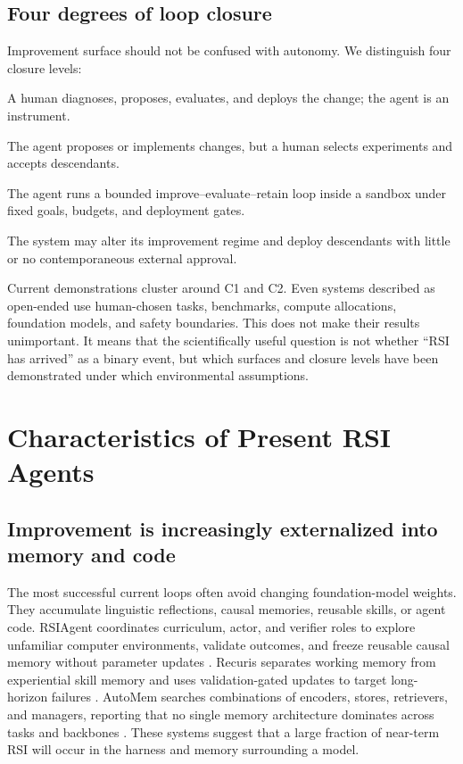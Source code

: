 \documentclass[11pt,a4paper]{article}
\begin{document}
\subsection{Four degrees of loop closure}

Improvement surface should not be confused with autonomy. We distinguish four closure levels:
\begin{description}[leftmargin=1.25cm,style=nextline]
  \item[C0] A human diagnoses, proposes, evaluates, and deploys the change; the agent is an instrument.
  \item[C1] The agent proposes or implements changes, but a human selects experiments and accepts descendants.
  \item[C2] The agent runs a bounded improve--evaluate--retain loop inside a sandbox under fixed goals, budgets, and deployment gates.
  \item[C3] The system may alter its improvement regime and deploy descendants with little or no contemporaneous external approval.
\end{description}
Current demonstrations cluster around C1 and C2. Even systems described as open-ended use human-chosen tasks, benchmarks, compute allocations, foundation models, and safety boundaries. This does not make their results unimportant. It means that the scientifically useful question is not whether ``RSI has arrived'' as a binary event, but which surfaces and closure levels have been demonstrated under which environmental assumptions.

\section{Characteristics of Present RSI Agents}

\subsection{Improvement is increasingly externalized into memory and code}

The most successful current loops often avoid changing foundation-model weights. They accumulate linguistic reflections, causal memories, reusable skills, or agent code. RSIAgent coordinates curriculum, actor, and verifier roles to explore unfamiliar computer environments, validate outcomes, and freeze reusable causal memory without parameter updates \cite{rsiagent}. Recuris separates working memory from experiential skill memory and uses validation-gated updates to target long-horizon failures \cite{recuris}. AutoMem searches combinations of encoders, stores, retrievers, and managers, reporting that no single memory architecture dominates across tasks and backbones \cite{automem}. These systems suggest that a large fraction of near-term RSI will occur in the harness and memory surrounding a model.
\end{document}
